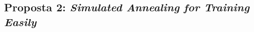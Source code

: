 \documentclass{beamer}
\begin{document}





\subsection{Proposta 2: \textit{Simulated Annealing for Training Easily}}
\end{document}
